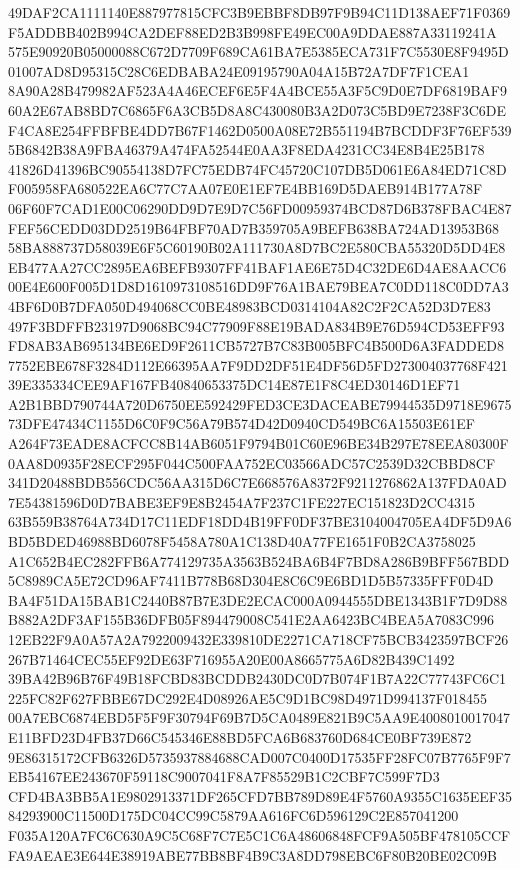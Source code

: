 \documentclass[UTF8,fontset=fandol,zihao=-4,a4paper]{ctexart}
\begin{document}
{{49DAF2CA1111140E887977815CFC3B9EBBF8DB97F9B94C11D138AEF71F0369F5ADDBB402B994CA2DEF88ED2B3B998FE49EC00A9DDAE887A33119241A
575E90920B05000088C672D7709F689CA61BA7E5385ECA731F7C5530E8F9495D01007AD8D95315C28C6EDBABA24E09195790A04A15B72A7DF7F1CEA1
8A90A28B479982AF523A4A46ECEF6E5F4A4BCE55A3F5C9D0E7DF6819BAF960A2E67AB8BD7C6865F6A3CB5D8A8C430080B3A2D073C5BD9E7238F3C6DE
F4CA8E254FFBFBE4DD7B67F1462D0500A08E72B551194B7BCDDF3F76EF5395B6842B38A9FBA46379A474FA52544E0AA3F8EDA4231CC34E8B4E25B178
41826D41396BC90554138D7FC75EDB74FC45720C107DB5D061E6A84ED71C8DF005958FA680522EA6C77C7AA07E0E1EF7E4BB169D5DAEB914B177A78F
06F60F7CAD1E00C06290DD9D7E9D7C56FD00959374BCD87D6B378FBAC4E87FEF56CEDD03DD2519B64FBF70AD7B359705A9BEFB638BA724AD13953B68
58BA888737D58039E6F5C60190B02A111730A8D7BC2E580CBA55320D5DD4E8EB477AA27CC2895EA6BEFB9307FF41BAF1AE6E75D4C32DE6D4AE8AACC6
00E4E600F005D1D8D1610973108516DD9F76A1BAE79BEA7C0DD118C0DD7A34BF6D0B7DFA050D494068CC0BE48983BCD0314104A82C2F2CA52D3D7E83
497F3BDFFB23197D9068BC94C77909F88E19BADA834B9E76D594CD53EFF93FD8AB3AB695134BE6ED9F2611CB5727B7C83B005BFC4B500D6A3FADDED8
7752EBE678F3284D112E66395AA7F9DD2DF51E4DF56D5FD273004037768F42139E335334CEE9AF167FB40840653375DC14E87E1F8C4ED30146D1EF71
A2B1BBD790744A720D6750EE592429FED3CE3DACEABE79944535D9718E967573DFE47434C1155D6C0F9C56A79B574D42D0940CD549BC6A15503E61EF
A264F73EADE8ACFCC8B14AB6051F9794B01C60E96BE34B297E78EEA80300F0AA8D0935F28ECF295F044C500FAA752EC03566ADC57C2539D32CBBD8CF
341D20488BDB556CDC56AA315D6C7E668576A8372F9211276862A137FDA0AD7E54381596D0D7BABE3EF9E8B2454A7F237C1FE227EC151823D2CC4315
63B559B38764A734D17C11EDF18DD4B19FF0DF37BE3104004705EA4DF5D9A6BD5BDED46988BD6078F5458A780A1C138D40A77FE1651F0B2CA3758025
A1C652B4EC282FFB6A774129735A3563B524BA6B4F7BD8A286B9BFF567BDD5C8989CA5E72CD96AF7411B778B68D304E8C6C9E6BD1D5B57335FFF0D4D
BA4F51DA15BAB1C2440B87B7E3DE2ECAC000A0944555DBE1343B1F7D9D88B882A2DF3AF155B36DFB05F894479008C541E2AA6423BC4BEA5A7083C996
12EB22F9A0A57A2A7922009432E339810DE2271CA718CF75BCB3423597BCF26267B71464CEC55EF92DE63F716955A20E00A8665775A6D82B439C1492
39BA42B96B76F49B18FCBD83BCDDB2430DC0D7B074F1B7A22C77743FC6C1225FC82F627FBBE67DC292E4D08926AE5C9D1BC98D4971D994137F018455
00A7EBC6874EBD5F5F9F30794F69B7D5CA0489E821B9C5AA9E4008010017047E11BFD23D4FB37D66C545346E88BD5FCA6B683760D684CE0BF739E872
9E86315172CFB6326D5735937884688CAD007C0400D17535FF28FC07B7765F9F7EB54167EE243670F59118C9007041F8A7F85529B1C2CBF7C599F7D3
CFD4BA3BB5A1E9802913371DF265CFD7BB789D89E4F5760A9355C1635EEF3584293900C11500D175DC04CC99C5879AA616FC6D596129C2E857041200
F035A120A7FC6C630A9C5C68F7C7E5C1C6A48606848FCF9A505BF478105CCFFA9AEAE3E644E38919ABE77BB8BF4B9C3A8DD798EBC6F80B20BE02C09B
}}
\end{document}
